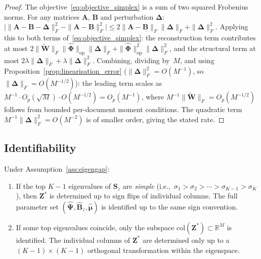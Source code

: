\begin{proof}
The objective~\eqref{eq:objective_simplex} is a sum of two squared
Frobenius norms. For any matrices $\mathbf{A}$, $\mathbf{B}$ and
perturbation $\boldsymbol{\Delta}$:
$\bigl|\|\mathbf{A}-\mathbf{B}-\boldsymbol{\Delta}\|_F^2
 - \|\mathbf{A}-\mathbf{B}\|_F^2\bigr|
\leq 2\|\mathbf{A}-\mathbf{B}\|_F\|\boldsymbol{\Delta}\|_F
    + \|\boldsymbol{\Delta}\|_F^2$.
Applying this to both terms of~\eqref{eq:objective_simplex}:
the reconstruction term contributes at most
$2\|\widetilde{\mathbf{W}}\|_F
 \|\hat{\boldsymbol{\Phi}}\|_{\mathrm{op}}
 \|\boldsymbol{\Delta}\|_F
 + \|\hat{\boldsymbol{\Phi}}\|_{\mathrm{op}}^2
   \|\boldsymbol{\Delta}\|_F^2$,
and the structural term at most
$2\lambda\|\boldsymbol{\Delta}\|_F
 + \lambda\|\boldsymbol{\Delta}\|_F^2$.
Combining, dividing by~$M$, and using
Proposition~\ref{prop:linearisation_error}
($\|\boldsymbol{\Delta}\|_F^2 = O(M^{-1})$, so
$\|\boldsymbol{\Delta}\|_F = O(M^{-1/2})$):
the leading term scales as
$M^{-1}\cdot O_p(\sqrt{M})\cdot O(M^{-1/2}) = O_p(M^{-1})$,
where $M^{-1}\|\widetilde{\mathbf{W}}\|_F = O_p(M^{-1/2})$
follows from bounded per-document moment conditions.
The quadratic term $M^{-1}\|\boldsymbol{\Delta}\|_F^2 = O(M^{-2})$
is of smaller order, giving the stated rate.
\end{proof}


\subsection{Identifiability}
\label{subsec:identifiability}

\begin{theorem}
\label{thm:identifiability_revised}
Under Assumption~\ref{ass:eigengap}:
\begin{enumerate}
  \item[\emph{(i)}]
    If the top $K{-}1$ eigenvalues of $\mathbf{S}_z$ are \emph{simple}
    (i.e.,\ $\sigma_1>\sigma_2>\cdots>\sigma_{K-1}>\sigma_K$), then
    $\mathbf{Z}^*$ is determined up to sign flips of individual columns.
    The full parameter set
    $(\hat{\boldsymbol{\Psi}},\hat{\mathbf{B}}_z,\hat{\boldsymbol{\mu}})$
    is identified up to the same sign convention.

  \item[\emph{(ii)}]
    If some top eigenvalues coincide, only the subspace
    $\mathrm{col}(\mathbf{Z}^*)\subset\mathbb{R}^M$ is identified.
    The individual columns of $\mathbf{Z}^*$ are determined only up to
    a $(K{-}1)\times(K{-}1)$ orthogonal transformation within the
    eigenspace.
\end{enumerate}
\end{theorem}

